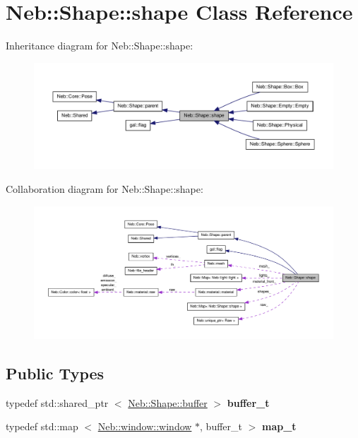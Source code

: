 \hypertarget{classNeb_1_1Shape_1_1shape}{\section{\-Neb\-:\-:\-Shape\-:\-:shape \-Class \-Reference}
\label{classNeb_1_1Shape_1_1shape}
}


\-Inheritance diagram for \-Neb\-:\-:\-Shape\-:\-:shape\-:
\nopagebreak
\begin{figure}[H]
\begin{center}
\leavevmode
\includegraphics[width=350pt]{classNeb_1_1Shape_1_1shape__inherit__graph}
\end{center}
\end{figure}


\-Collaboration diagram for \-Neb\-:\-:\-Shape\-:\-:shape\-:
\nopagebreak
\begin{figure}[H]
\begin{center}
\leavevmode
\includegraphics[width=350pt]{classNeb_1_1Shape_1_1shape__coll__graph}
\end{center}
\end{figure}
\subsection*{\-Public \-Types}
\begin{DoxyCompactItemize}
\item 
\hypertarget{classNeb_1_1Shape_1_1shape_adeae7cac9264b6e69472cc6805595d98}{typedef std\-::shared\-\_\-ptr\*
$<$ \hyperlink{classNeb_1_1Shape_1_1buffer}{\-Neb\-::\-Shape\-::buffer} $>$ {\bfseries buffer\-\_\-t}}\label{classNeb_1_1Shape_1_1shape_adeae7cac9264b6e69472cc6805595d98}

\item 
\hypertarget{classNeb_1_1Shape_1_1shape_a2e96cc27b784e0aef915f8e1e0419279}{typedef std\-::map\*
$<$ \hyperlink{classNeb_1_1window_1_1window}{\-Neb\-::window\-::window} \*
$\ast$, buffer\-\_\-t $>$ {\bfseries map\-\_\-t}}\label{classNeb_1_1Shape_1_1shape_a2e96cc27b784e0aef915f8e1e0419279}

\end{DoxyCompactItemize}
